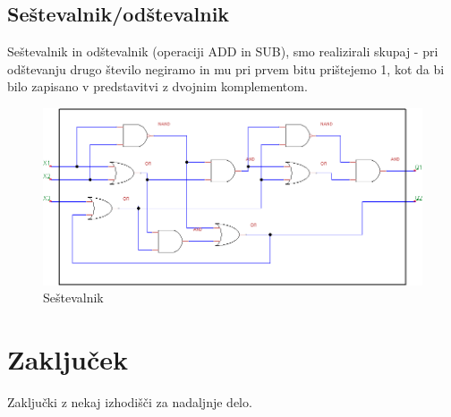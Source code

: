 \documentclass[seminar, slovene]{FRIreport}
\begin{document}
\subsection{Seštevalnik/odštevalnik}
Seštevalnik in odštevalnik (operaciji ADD in SUB), smo realizirali skupaj - pri odštevanju drugo število negiramo in mu pri prvem bitu prištejemo 1, kot da bi bilo zapisano v predstavitvi z dvojnim komplementom.
\begin{figure}[htb]
\includegraphics[width=14cm]{vezja/img/sestevalnik}
\caption{Seštevalnik}
\label{sestevalnik}
\end{figure}
\pagebreak

%
\section{Zaključek}
Zaključki z nekaj izhodišči za nadaljnje delo.

%
\References


\end{document}
